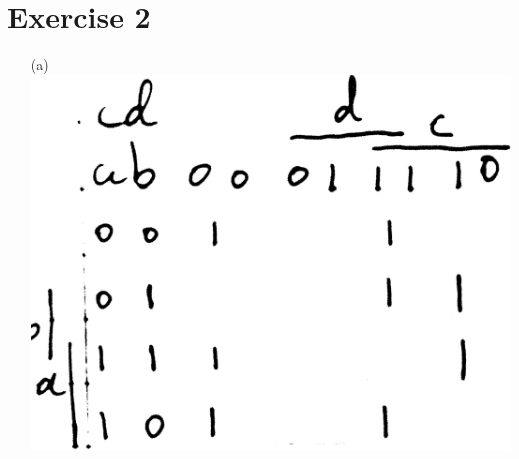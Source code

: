 \documentclass[10pt,twoside,a4paper]{article}
\begin{document}
\section*{Exercise 2}
\begin{enumerate}
\item[(a)]
\includegraphics[scale=0.1]{sv2-2-a1.png} 

\end{enumerate}
\end{document}
